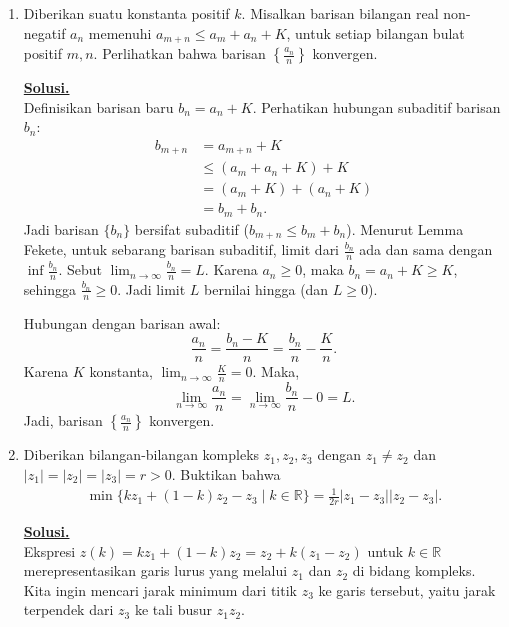 \documentclass[12pt,twoside]{article}
\newenvironment{solution}
{
	\par\noindent\textbf{\underline{Solusi.}}\\
}
{
	\par
}
\begin{document}
\begin{enumerate}
\begin{solution}
          Akibatnya, $|\text{Im}(\phi)| = 1$. Ini berarti $\text{Im}(\phi)$ hanya berisi identitas di $\text{Aut}(H)$.
          Jadi, $\phi(g) = \text{id}_H$ untuk setiap $g \in G$.
          Artinya $\phi(g)(h) = h \implies ghg^{-1} = h \implies gh = hg$ untuk setiap $g \in G, h \in H$.
          Terbukti.
        \end{solution}
  \item Diberikan suatu konstanta positif $k$. Misalkan barisan bilangan real non-negatif ${a_n}$ memenuhi $a_{m+n}\leq a_m+a_n+K$, untuk setiap bilangan bulat positif $m,n$. Perlihatkan bahwa barisan $\left\{\frac{a_n}{n}\right\}$ konvergen.
        \begin{solution}
          Definisikan barisan baru $b_n = a_n + K$.
          Perhatikan hubungan subaditif barisan $b_n$:
          \begin{align*}
            b_{m+n} & = a_{m+n} + K           \\
                    & \le (a_m + a_n + K) + K \\
                    & = (a_m + K) + (a_n + K) \\
                    & = b_m + b_n.
          \end{align*}
          Jadi barisan $\{b_n\}$ bersifat subaditif ($b_{m+n} \le b_m + b_n$).
          Menurut Lemma Fekete, untuk sebarang barisan subaditif, limit dari $\frac{b_n}{n}$ ada dan sama dengan $\inf \frac{b_n}{n}$.
          Sebut $\lim_{n \to \infty} \frac{b_n}{n} = L$.
          Karena $a_n \ge 0$, maka $b_n = a_n + K \ge K$, sehingga $\frac{b_n}{n} \ge 0$. Jadi limit $L$ bernilai hingga (dan $L \ge 0$).

          Hubungan dengan barisan awal:
          \[ \frac{a_n}{n} = \frac{b_n - K}{n} = \frac{b_n}{n} - \frac{K}{n}. \]
          Karena $K$ konstanta, $\lim_{n \to \infty} \frac{K}{n} = 0$.
          Maka,
          \[ \lim_{n \to \infty} \frac{a_n}{n} = \lim_{n \to \infty} \frac{b_n}{n} - 0 = L. \]
          Jadi, barisan $\left\{\frac{a_n}{n}\right\}$ konvergen.
        \end{solution}
  \item Diberikan bilangan-bilangan kompleks $z_1,z_2,z_3$ dengan $z_1\neq z_2$ dan $|z_1|=|z_2|=|z_3|=r>0$. Buktikan bahwa
        \begin{align*}
          \min\{kz_1+(1-k)z_2-z_3\mid k\in \mathbb{R}\} = \frac{1}{2r}|z_1-z_3||z_2-z_3|.
        \end{align*}
        \begin{solution}
          Ekspresi $z(k) = kz_1 + (1-k)z_2 = z_2 + k(z_1-z_2)$ untuk $k \in \mathbb{R}$ merepresentasikan garis lurus yang melalui $z_1$ dan $z_2$ di bidang kompleks.
          Kita ingin mencari jarak minimum dari titik $z_3$ ke garis tersebut, yaitu jarak terpendek dari $z_3$ ke tali busur $z_1z_2$.


\end{solution}
\end{enumerate}
\end{document}
